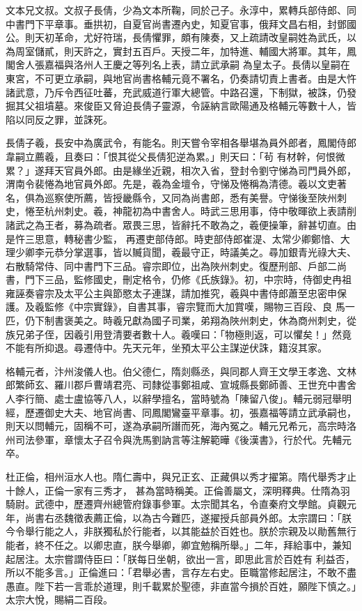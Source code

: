 \begin{pinyinscope}
 文本兄文叔。文叔子長倩，少為文本所鞠，同於己子。永淳中，累轉兵部侍郎、同中書門下平章事。垂拱初，自夏官尚書遷內史，知夏官事，俄拜文昌右相，封鄧國公。則天初革命，尤好符瑞，長倩懼罪，頗有陳奏，又上疏請改皇嗣姓為武氏，以為周室儲貳，則天許之，實封五百戶。天授二年，加特進、輔國大將軍。其年，鳳閣舍人張嘉福與洛州人王慶之等列名上表，請立武承嗣
 為皇太子。長倩以皇嗣在東宮，不可更立承嗣，與地官尚書格輔元竟不署名，仍奏請切責上書者。由是大忤諸武意，乃斥令西征吐蕃，充武威道行軍大總管。中路召還，下制獄，被誅，仍發掘其父祖墳墓。來俊臣又脅迫長倩子靈源，令誣納言歐陽通及格輔元等數十人，皆陷以同反之罪，並誅死。



 長倩子羲，長安中為廣武令，有能名。則天嘗令宰相各舉堪為員外郎者，鳳閣侍郎韋嗣立薦羲，且奏曰：「恨其從父長倩犯逆為累。」則天曰：「茍
 有材幹，何恨微累？」遂拜天官員外郎。由是緣坐近親，相次入省，登封令劉守悌為司門員外郎，渭南令裴惓為地官員外郎。先是，羲為金壇令，守悌及惓稱為清德。羲以文吏著名，俱為巡察使所薦，皆授畿縣令，又同為尚書郎，悉有美譽。守悌後至陜州刺史，惓至杭州刺史。羲，神龍初為中書舍人。時武三思用事，侍中敬暉欲上表請削諸武之為王者，募為疏者。眾畏三思，皆辭托不敢為之，羲便操筆，辭甚切直。由是忤三思意，轉秘書少監，
 再遷吏部侍郎。時吏部侍郎崔湜、太常少卿鄭愔、大理少卿李元恭分掌選事，皆以贓貨聞，羲最守正，時議美之。尋加銀青光祿大夫、右散騎常侍、同中書門下三品。睿宗即位，出為陜州刺史。復歷刑部、戶部二尚書，門下三品，監修國史，刪定格令，仍修《氏族錄》。初，中宗時，侍御史冉祖雍誣奏睿宗及太平公主與節愍太子連謀，請加推究，羲與中書侍郎蕭至忠密申保護。及羲監修《中宗實錄》，自書其事，睿宗覽而大加賞嘆，賜物三百段、良
 馬一匹，仍下制書褒美之。時羲兄獻為國子司業，弟翔為陜州刺史，休為商州刺史，從族兄弟子侄，因羲引用登清要者數十人。羲嘆曰：「物極則返，可以懼矣！」然竟不能有所抑退。尋遷侍中。先天元年，坐預太平公主謀逆伏誅，籍沒其家。



 格輔元者，汴州浚儀人也。伯父德仁，隋剡縣丞，與同郡人齊王文學王孝逸、文林郎繁師玄、羅川郡戶曹靖君亮、司隸從事鄭祖咸、宣城縣長鄭師善、王世充中書舍
 人李行簡、處士盧協等八人，以辭學擅名，當時號為「陳留八俊」。輔元弱冠舉明經，歷遷御史大夫、地官尚書、同鳳閣鸞臺平章事。初，張嘉福等請立武承嗣也，則天以問輔元，固稱不可，遂為承嗣所譖而死，海內冤之。輔元兄希元，高宗時洛州司法參軍，章懷太子召令與洗馬劉訥言等注解範曄《後漢書》，行於代。先輔元卒。



 杜正倫，相州洹水人也。隋仁壽中，與兄正玄、正藏俱以秀才擢第。隋代舉秀才止十餘人，正倫一家有三秀才，
 甚為當時稱美。正倫善屬文，深明釋典。仕隋為羽騎尉。武德中，歷遷齊州總管府錄事參軍。太宗聞其名，令直秦府文學館。貞觀元年，尚書右丞魏徵表薦正倫，以為古今難匹，遂擢授兵部員外郎。太宗謂曰：「朕今令舉行能之人，非朕獨私於行能者，以其能益於百姓也。朕於宗親及以勛舊無行能者，終不任之。以卿忠直，朕今舉卿，卿宜勉稱所舉。」二年，拜給事中，兼知起居注。太宗嘗謂侍臣曰：「朕每日坐朝，欲出一言，即思此言於百姓有
 利益否，所以不能多言。」正倫進曰：「君舉必書，言存左右史。臣職當修起居注，不敢不盡愚直。陛下若一言乖於道理，則千載累於聖德，非直當今損於百姓，願陛下慎之。」太宗大悅，賜絹二百段。




\end{pinyinscope}
